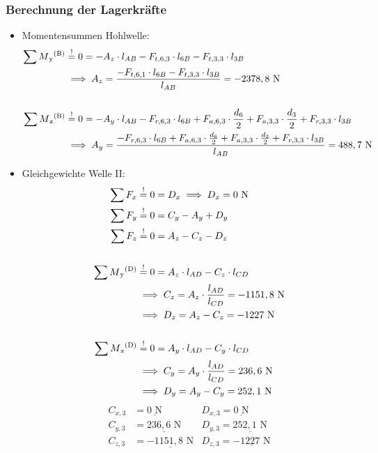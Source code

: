 \subsubsection{Berechnung der Lagerkräfte}
\begin{itemize}
	\item Momentensummen Hohlwelle:
	\begin{align*}
	\sum M\textsubscript{y}\textsuperscript{(B)} &\overset{!}{=} 0 = -A_z \cdot l_{AB} - F_{t,6,3} \cdot l_{6B} - F_{t,3,3} \cdot l_{3B} \\
	&\implies A_z =  \frac{-F_{t,6,1} \cdot l_{6B} - F_{t,3,3} \cdot l_{3B}}{l_{AB}} = -2378,8\text{ N} \\ \\
	\sum M\textsubscript{z}\textsuperscript{(B)} &\overset{!}{=} 0 = -A_y \cdot l_{AB} - F_{r,6,3} \cdot l_{6B} + F_{a,6,3} \cdot \frac{d_6}{2} + F_{a,3,3} \cdot \frac{d_3}{2} + F_{r,3,3} \cdot l_{3B}\\
	&\implies A_y = \frac{-F_{r,6,3} \cdot l_{6B} + F_{a,6,3} \cdot \frac{d_6}{2} +F_{a,3,3} \cdot \frac{d_3}{2} + F_{r,3,3} \cdot l_{3B}} {l_{AB}}= 488,7 \text{ N} 
	\end{align*}
	\item Gleichgewichte Welle II:
	\begin{align*}
	\sum F_x &\overset{!}{=} 0 =  D_x \implies D_x =  0 \text{ N} \\
	\sum F_y &\overset{!}{=} 0 = C_y -A_y +D_y \\ 
	\sum F_z &\overset{!}{=} 0 = A_z - C_z - D_z\\ \\
	\sum M\textsubscript{y}\textsuperscript{(D)} &\overset{!}{=} 0 = A_z \cdot l_{AD} - C_z \cdot l_{CD}\\ 
	&\implies C_z = A_z \cdot \frac{l_{AD}}{l_{CD}} = -1151,8 \text { N} \\ 
	& \implies D_z = A_z - C_z = -1227 \text{ N}\\ \\
	\sum M\textsubscript{z}\textsuperscript{(D)} &\overset{!}{=} 0 = A_y \cdot l_{AD} - C_y \cdot l_{CD} \\ 
	&\implies C_y = A_y \cdot \frac{l_{AD}}{l_{CD}} = 236,6 \text{ N}\\ 
	& \implies D_y =   A_y - C_y = 252,1\text{ N}
	\end{align*}
	\begin{align*}
	C_{x,3} &= \underline{0\text{ N}} & D_{x,3}= \underline{0\text{ N}}\\
	C_{y,3} &= \underline{236,6\text{ N}} & D_{y,3}= \underline{252,1\text{ N}}\\
	C_{z,3} &= \underline{-1151,8\text{ N}} & D_{z,3}= \underline{-1227\text{ N}}
	\end{align*}
\end{itemize}
